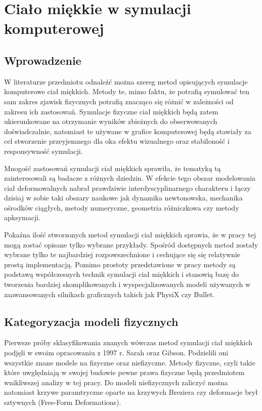 \chapter{Ciało miękkie w symulacji komputerowej}

\section{Wprowadzenie}

W literaturze przedmiotu odnaleźć można szereg metod opisujących symulacje komputerowe ciał
miękkich. Metody te, mimo faktu, że potrafią symulować ten sam zakres zjawisk
fizycznych potrafią znacząco się różnić w zależności od zakresu ich zastosowań.
Symulacje fizyczne ciał miękkich będą zatem ukierunkowane na otrzymanie wyników
zbieżnych do obserwowanych doświadczalnie, natomiast te używane w grafice
komputerowej będą stawiały za cel stworzenie przeyjemnego dla oka efektu
wizualnego oraz stabiloność i responsywność symulacji.

Mnogość zastosowań symulacji ciał miękkich sprawiła, że tematyką tą
zainteresowali są badacze z różnych dziedzin. W efekcie tego obszar modelowania ciał
deformowalnych nabrał prawdziwie interdyscyplinarnego charakteru i łączy dzisiaj w sobie
taki obszary naukowe jak dynamika newtonowska, mechanika ośrodków ciągłych,
metody numeryczne, geometria różniczkowa czy metody apksymacji\cite{pbdo}.

Pokaźna ilość stworzonych metod symulacji ciał miękkich sprawia, że w pracy tej mogą zostać
opisane tylko wybrane przykłady. Spośród dostępnych metod zostały wybrane tylko 
te najbardziej rozpowszechnione i cechujące się się
relatywnie prostą implementacją. Pomimo prostoty przedstawione w pracy
metody są podstawą współczesnych technik symulacji ciał
miękkich i stanowią bazę do tworzenia bardziej skomplikowanych i 
wyspecjalizowanych modeli używanych w zaawansowanych silnikach graficznych
takich jak PhysiX czy Bullet.

\section{Kategoryzacja modeli fizycznych}

Pierwsze próby sklasyfikowania znanych wówczas metod symulacji ciał miękkich
podjęli w swoim opracowaniu z 1997 r. Sarah oraz Gibson\cite{survey}. Podzielili
oni wszystkie znane modele na fizyczne oraz niefizyczne. Metody fizyczne, czyli
takie które uwględniają w swojej budowie pewne prawa fizyczne będą przedmiotem
wnikliwszej analizy w tej pracy. Do modeli niefizycznych zaliczyć można natomiast
krzywe paramtryczne oparte na krzywych Breziera czy deformacje brył sztywnych (Free-Form Deformations).\cite{pbdo}

